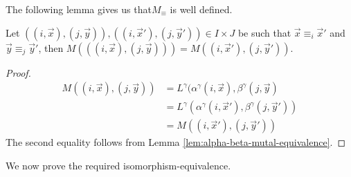 \documentclass[../paper.tex]{subfiles}
\begin{document}
The following lemma gives us that$M_\equiv$ is well defined.

\begin{lem}
	Let $((i, \vec{x}), (j, \vec{y})), ((i, \vec{x}'), (j, \vec{y}')) \in I \times
	J$ be such that $\vec{x} \equiv_i \vec{x}'$ and $\vec{y} \equiv_j \vec{y}'$,
	then $M(((i, \vec{x}), (j, \vec{y}))) = M((i, \vec{x}'), (j, \vec{y}'))$.
	\label{lem:matrix-quot-well-defined}
\end{lem}
\begin{proof}
	\begin{align*}
		M((i, \vec{x}),(j, \vec{y})) & = L^{\gamma}(\alpha^{\gamma}(i, \vec{x}), \beta^{\gamma}(j, \vec{y})    \\
		                             & = L^{\gamma}(\alpha^{\gamma}(i, \vec{x}'), \beta^{\gamma}(j, \vec{y}')) \\
		                             & = M((i, \vec{x}'), (j, \vec{y}'))                                       
	\end{align*}
	The second equality follows from Lemma \ref{lem:alpha-beta-mutal-equivalence}.
\end{proof}

We now prove the required isomorphism-equivalence.
\end{document}

